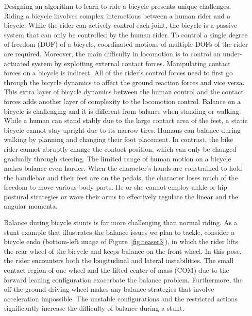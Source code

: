 Designing an algorithm to learn to ride a bicycle presents unique challenges. Riding a bicycle involves complex interactions between a human rider and a bicycle. While the rider can actively control each joint, the bicycle is a passive system that can only be controlled by the human rider. To control a single degree of freedom (DOF) of a bicycle, coordinated motions of multiple DOFs of the rider are required. Moreover, the main difficulty in locomotion is to control an under-actuated system by exploiting external contact forces. Manipulating contact forces on a bicycle is indirect. All of the rider's control forces need to first go through the bicycle dynamics to affect the ground reaction forces and vice versa. This extra layer of bicycle dynamics between the human control and the contact forces adds another layer of complexity to the locomotion control. Balance on a bicycle is challenging and it is different from balance when standing or walking. While a human can stand stably due to the large contact area of the feet, a static bicycle cannot stay upright due to its narrow tires. Humans can balance during walking by planning and changing their foot placement. In contrast, the bike rider cannot abruptly change the contact position, which can only be changed gradually through steering. The limited range of human motion on a bicycle makes balance even harder. When the character's hands are constrained to hold the handlebar and their feet are on the pedals, the character loses much of the freedom to move various body parts. He or she cannot employ ankle or hip postural strategies or wave their arms to effectively regulate the linear and the angular momenta.

Balance during bicycle stunts is far more challenging than normal riding. As a stunt example that illustrates the balance issues we plan to tackle, consider a bicycle endo (bottom-left image of Figure~\ref{fig:teaser3}), in which the rider lifts the rear wheel of the bicycle and keeps balance on the front wheel. In this pose, the rider encounters both the longitudinal and lateral instabilities. The small contact region of one wheel and the lifted center of mass (COM) due to the forward leaning configuration exacerbate the balance problem. Furthermore, the off-the-ground driving wheel makes any balance strategies that involve acceleration impossible. The unstable configurations and the restricted actions significantly increase the difficulty of balance during a stunt.


